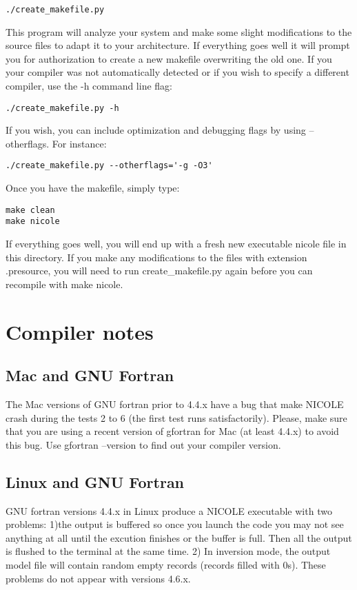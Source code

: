 \begin{verbatim}
./create_makefile.py
\end{verbatim}

This program will analyze your system and make some slight
modifications to the source files to adapt it to your architecture. If
everything goes well it will prompt you for authorization to create
a new makefile overwriting the old one. If you your compiler was not
automatically detected or if you wish to specify a different compiler,
use the -h command line flag:

\begin{verbatim}
./create_makefile.py -h
\end{verbatim}

If you wish, you can include optimization and debugging flags by using
--otherflags. For instance:
\begin{verbatim}
./create_makefile.py --otherflags='-g -O3'
\end{verbatim}

Once you have the makefile, simply type:
\begin{verbatim}
make clean
make nicole
\end{verbatim}


If everything goes well, you will end up with a fresh new 
executable nicole file in this directory. If you make any
modifications to the files with extension .presource, you will need to
run create\_makefile.py again before you can recompile with make nicole.

\section{Compiler notes} 

\subsection{Mac and GNU Fortran}
The Mac versions of GNU fortran prior to 4.4.x have a bug that make
NICOLE crash during the tests 2 to 6 (the first test runs
satisfactorily). Please, make sure that you are using a recent version
of gfortran for Mac (at least 4.4.x) to avoid this bug. Use gfortran
--version to find out your compiler version.

\subsection{Linux and GNU Fortran}
GNU fortran versions 4.4.x in Linux produce a NICOLE executable with
two problems: 1)the output is buffered so once you launch the code you
may not see anything at all until the excution finishes or the buffer
is full. Then all the output is flushed to the terminal at the same
time. 2) In inversion mode, the output model file will contain random
empty records (records filled with 0s). These problems do not appear
with versions 4.6.x.

